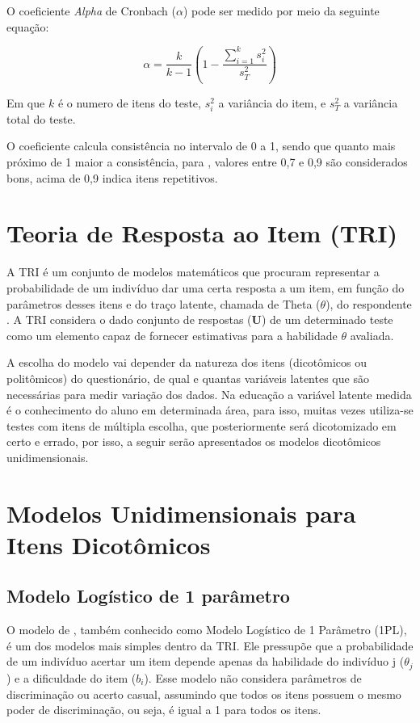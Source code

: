 O coeficiente \textit{Alpha} de Cronbach ($\alpha$) pode ser medido por meio da seguinte equação:

\begin{equation}
	\alpha = \frac{k}{k-1}(1 - \frac{\sum_{i=1}^{k}{s^2_i}}{s_T^2})
\end{equation}

 Em que $k$ é o numero de itens do teste, ${s_i^2}$ a variância do item, e
${s_T^2}$ a variância total do teste.

O coeficiente calcula consistência no intervalo de 0 a 1, sendo que quanto mais próximo de 1 maior a consistência, para , valores entre 0,7 e 0,9 são considerados bons, acima de 0,9 indica itens repetitivos.

\section{Teoria de Resposta ao Item (TRI)}

A TRI é um conjunto de modelos matemáticos que procuram representar a probabilidade de um indivíduo dar uma certa resposta a um item, em função do parâmetros desses itens e do traço latente, chamada de Theta ($\theta$), do respondente \cite{de2000teoria}. A TRI considera o dado conjunto de respostas ($\textbf{U}$) de um determinado teste como um elemento capaz de fornecer estimativas para a habilidade $\theta$ avaliada. \cite{baker2001}


A escolha do modelo vai depender da natureza dos itens (dicotômicos ou politômicos) do questionário, de qual e quantas variáveis latentes que são necessárias para medir variação dos dados. Na educação a variável latente medida é o conhecimento do aluno em determinada área, para isso, muitas vezes utiliza-se testes com itens de múltipla escolha, que posteriormente será dicotomizado em certo e errado, por isso, a seguir serão apresentados os modelos dicotômicos unidimensionais. 

\section{Modelos Unidimensionais para Itens Dicotômicos}

\subsection{Modelo Logístico de 1 parâmetro}

O modelo de , também conhecido como Modelo Logístico de 1 Parâmetro (1PL), é um dos modelos mais simples dentro da TRI. Ele pressupõe que a probabilidade de um indivíduo acertar um item depende apenas da habilidade do indivíduo j ($\theta_j$) e a dificuldade do item ($b_i$). Esse modelo não considera parâmetros de discriminação ou acerto casual, assumindo que todos os itens possuem o mesmo poder de discriminação, ou seja, é igual a 1 para todos os itens.


